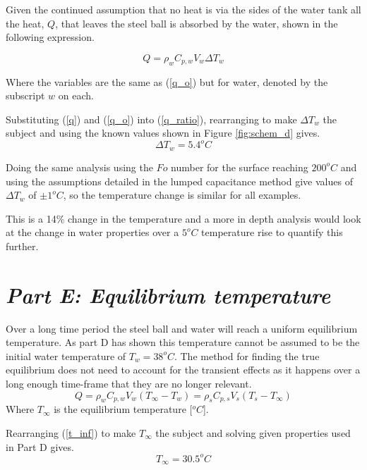 \documentclass[11pt]{article}
\begin{document}
Given the continued assumption that no heat is via the sides of the water tank all the heat, $Q$, that leaves the steel ball is absorbed by the water, shown in the following expression.

\begin{equation}\label{q}
	Q = \rho_w C_{p,w} V_w \Delta T_{w}
\end{equation}

Where the variables are the same as (\ref{q_o}) but for water, denoted by the subscript $w$ on each.

Substituting (\ref{q}) and (\ref{q_o}) into (\ref{q_ratio}), rearranging to make $\Delta T_w$ the subject and using the known values shown in Figure \ref{fig:schem_d} gives.
\begin{equation}\label{delta_t}
	\Delta T_w = 5.4 ^oC
\end{equation}

Doing the same analysis using the $Fo$ number for the surface reaching $200^oC$ and using the assumptions detailed in the lumped capacitance method give values of $\Delta T_w$ of $\pm1^oC$, so the temperature change is similar for all examples.

This is a 14\% change in the temperature and a more in depth analysis would look at the change in water properties over a $5^oC$ temperature rise to quantify this further.

\FloatBarrier
\section{\emph{Part E: Equilibrium temperature}}
Over a long time period the steel ball and water will reach a uniform equilibrium temperature. As part D has shown this temperature cannot be assumed to be the initial water temperature of $T_w = 38^oC$. The method for finding the true equilibrium does not need to account for the transient effects as it happens over a long enough time-frame that they are no longer relevant.
\begin{equation}\label{t_inf}
	Q = \rho_w C_{p,w} V_w (T_\infty- T_w) = \rho_s C_{p,s} V_s (T_s-T_\infty)
\end{equation}
Where $T_\infty$ is the equilibrium temperature [$^oC$].

Rearranging (\ref{t_inf}) to make $T_\infty$ the subject and solving given properties used in Part D gives.
\boldmath
\begin{equation}\label{key}
	T_\infty = 30.5^oC
\end{equation}
\unboldmath


\end{document}
